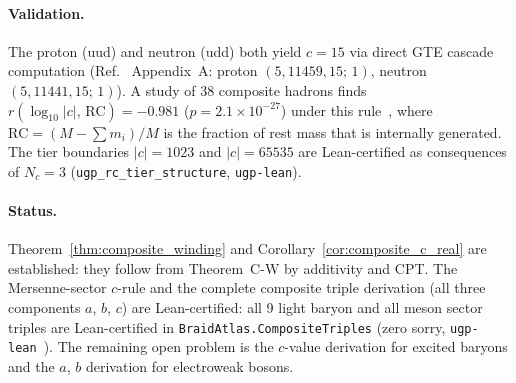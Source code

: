 \documentclass[11pt]{article}
\theoremstyle{remark}
\begin{document}
\paragraph{Validation.}
The proton (uud) and neutron (udd) both yield $c = 15$ via direct GTE cascade computation
(Ref.~\cite{Spivack2026_SM_UGP} Appendix~A: proton $(5,11459,15;\,1)$, neutron $(5,11441,15;\,1)$).
A study of 38 composite hadrons finds $r(\log_{10}|c|,\,\mathrm{RC}) = -0.981$
($p = 2.1\times10^{-27}$) under this rule~\cite{Spivack2026_Closure24},
where $\mathrm{RC} = (M - \sum m_i)/M$ is the fraction of rest mass that is
internally generated.
The tier boundaries $|c| = 1023$ and $|c| = 65535$ are Lean-certified as
consequences of $N_c=3$ (\texttt{ugp\_rc\_tier\_structure}, \texttt{ugp-lean}).

\begin{table}[H]
\centering
\caption{Composite hadron $c$-values from the Mersenne-sector rule
  (all positive real by Corollary~\ref{cor:composite_c_real}).
  The $a$ and $b$ components are Lean-derived for all 9 light baryons
  and all meson sectors (\texttt{ugp\_all\_baryon\_b\_formulas},
  \texttt{ugp\_composite\_sector\_rule}; zero sorry, \texttt{ugp-lean}).}
\label{tab:composite_c}
\footnotesize
\renewcommand{\arraystretch}{1.1}
\end{table}

\paragraph{Status.}
Theorem~\ref{thm:composite_winding} and Corollary~\ref{cor:composite_c_real} are
established: they follow from Theorem~C-W by additivity and CPT.
The Mersenne-sector $c$-rule and the complete composite triple derivation
(all three components $a$, $b$, $c$) are Lean-certified: all 9 light baryon
and all meson sector triples are Lean-certified in
\texttt{BraidAtlas.CompositeTriples} (zero sorry, \texttt{ugp-lean}~\cite{SpivackUGPFormalization,ugp-lean}).
The remaining open problem is the $c$-value derivation for excited baryons
and the $a$, $b$ derivation for electroweak bosons.
\end{document}
